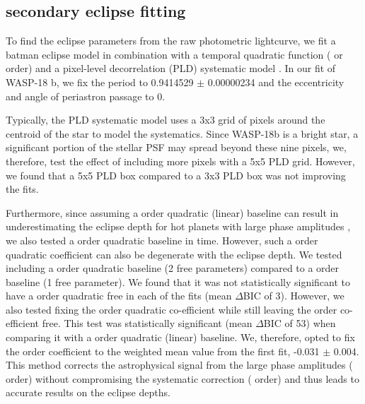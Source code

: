 \subsection{\spitzerIRAC secondary eclipse fitting}
\label{P3:sec:fitting}

To find the eclipse parameters from the raw photometric lightcurve, we fit a batman eclipse model \citep{Kreidberg2015} in combination with a temporal quadratic function ( or  order) and a pixel-level decorrelation (PLD) systematic model \citep{Deming2015}. In our fit of WASP-18 b, we fix the period to 0.9414529 $\pm$ 0.00000234 \citep{Pearson2019} and the eccentricity and angle of periastron passage to 0.

Typically, the PLD systematic model uses a 3x3 grid of pixels around the centroid of the star to model the systematics. Since WASP-18b is a bright star, a significant portion of the stellar PSF may spread beyond these nine pixels, we, therefore, test the effect of including more pixels with a 5x5 PLD grid. However, we found that a 5x5 PLD box compared to a 3x3 PLD box was not improving the fits.

Furthermore, since assuming a  order quadratic (linear) baseline can result in underestimating the eclipse depth for hot planets with large phase amplitudes \citep[e.g.,][]{Bell2019}, we also tested a  order quadratic baseline in time. However, such a  order quadratic coefficient can also be degenerate with the eclipse depth. We tested including a  order quadratic baseline (2 free parameters) compared to a  order baseline (1 free parameter). We found that it was not statistically significant to have a  order quadratic free in each of the fits (mean $\Delta$BIC of 3). However, we also tested fixing the  order quadratic co-efficient while still leaving the  order co-efficient free. This test was statistically significant (mean $\Delta$BIC of 53) when comparing it with a  order quadratic (linear) baseline. We, therefore, opted to fix the  order coefficient to the weighted mean value from the first fit, -0.031 $\pm$ 0.004. This method corrects the astrophysical signal from the large phase amplitudes ( order) without compromising the systematic correction ( order) and thus leads to accurate results on the eclipse depths.

